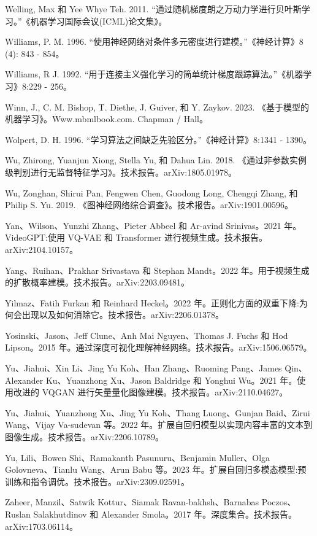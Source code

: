 \documentclass[10pt]{report}
\begin{document}
Welling, Max 和 Yee Whye Teh. 2011. “通过随机梯度朗之万动力学进行贝叶斯学习。”《机器学习国际会议(ICML)论文集》。

Williams, P. M. 1996. “使用神经网络对条件多元密度进行建模。”《神经计算》8 (4): 843 - 854。

Williams, R J. 1992. “用于连接主义强化学习的简单统计梯度跟踪算法。”《机器学习》8:229 - 256。

Winn, J., C. M. Bishop, T. Diethe, J. Guiver, 和 Y. Zaykov. 2023. 《基于模型的机器学习》。Www.mbmlbook.com. Chapman / Hall。

Wolpert, D. H. 1996. “学习算法之间缺乏先验区分。”《神经计算》8:1341 - 1390。

Wu, Zhirong, Yuanjun Xiong, Stella Yu, 和 Dahua Lin. 2018. 《通过非参数实例级判别进行无监督特征学习》。技术报告。arXiv:1805.01978。

Wu, Zonghan, Shirui Pan, Fengwen Chen, Guodong Long, Chengqi Zhang, 和 Philip S. Yu. 2019. 《图神经网络综合调查》。技术报告。arXiv:1901.00596。

Yan、Wilson、Yunzhi Zhang、Pieter Abbeel 和 Ar-avind Srinivas。2021 年。VideoGPT:使用 VQ-VAE 和 Transformer 进行视频生成。技术报告。arXiv:2104.10157。

Yang、Ruihan、Prakhar Srivastava 和 Stephan Mandt。2022 年。用于视频生成的扩散概率建模。技术报告。arXiv:2203.09481。

Yilmaz、Fatih Furkan 和 Reinhard Heckel。2022 年。正则化方面的双重下降:为何会出现以及如何消除它。技术报告。arXiv:2206.01378。

Yosinski、Jason、Jeff Clune、Anh Mai Nguyen、Thomas J. Fuchs 和 Hod Lipson。2015 年。通过深度可视化理解神经网络。技术报告。arXiv:1506.06579。

Yu、Jiahui、Xin Li、Jing Yu Koh、Han Zhang、Ruoming Pang、James Qin、Alexander Ku、Yuanzhong Xu、Jason Baldridge 和 Yonghui Wu。2021 年。使用改进的 VQGAN 进行矢量量化图像建模。技术报告。arXiv:2110.04627。

Yu、Jiahui、Yuanzhong Xu、Jing Yu Koh、Thang Luong、Gunjan Baid、Zirui Wang、Vijay Va-sudevan 等。2022 年。扩展自回归模型以实现内容丰富的文本到图像生成。技术报告。arXiv:2206.10789。

Yu, Lili、Bowen Shi、Ramakanth Pasunuru、Benjamin Muller、Olga Golovneva、Tianlu Wang、Arun Babu 等。2023 年。扩展自回归多模态模型:预训练和指令调优。技术报告。arXiv:2309.02591。

Zaheer, Manzil、Satwik Kottur、Siamak Ravan-bakhsh、Barnabas Poczos、Ruslan Salakhutdinov 和 Alexander Smola。2017 年。深度集合。技术报告。arXiv:1703.06114。
\end{document}
